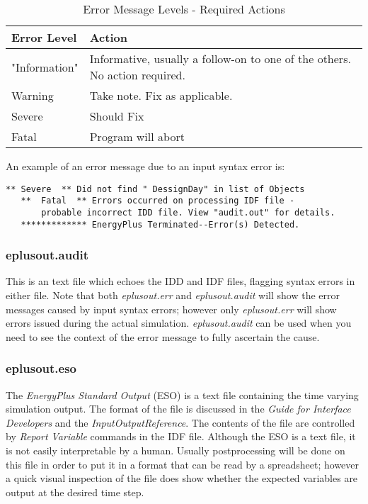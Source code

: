 \begin{longtable}[c]{p{1.5in}p{4.5in}}
\caption{Error Message Levels - Required Actions \protect \label{table:error-message-levels-required-actions-001}}\\
\toprule 
Error Level & Action \tabularnewline \midrule
\endhead
"Information" & Informative, usually a follow-on to one of the others. No action required. \tabularnewline
Warning & Take note. Fix as applicable. \tabularnewline
Severe & Should Fix \tabularnewline
Fatal & Program will abort \tabularnewline
\bottomrule
\end{longtable}

An example of an error message due to an input syntax error is:

\begin{lstlisting}
** Severe  ** Did not find " DessignDay" in list of Objects
   **  Fatal  ** Errors occurred on processing IDF file -
       probable incorrect IDD file. View "audit.out" for details.
   ************* EnergyPlus Terminated--Error(s) Detected.
\end{lstlisting}

\subsubsection{eplusout.audit}\label{eplusout.audit}

This is an text file which echoes the IDD and IDF files, flagging syntax errors in either file. Note that both \emph{eplusout.err} and \emph{eplusout.audit} will show the error messages caused by input syntax errors; however only \emph{eplusout.err} will show errors issued during the actual simulation. \emph{eplusout.audit} can be used when you need to see the context of the error message to fully ascertain the cause.

\subsubsection{eplusout.eso}\label{eplusout.eso}

The \emph{EnergyPlus Standard Output} (ESO) is a text file containing the time varying simulation output. The format of the file is discussed in the \emph{Guide for Interface Developers} and the \emph{InputOutputReference}. The contents of the file are controlled by \emph{Report Variable} commands in the IDF file. Although the ESO is a text file, it is not easily interpretable by a human. Usually postprocessing will be done on this file in order to put it in a format that can be read by a spreadsheet; however a quick visual inspection of the file does show whether the expected variables are output at the desired time step.

